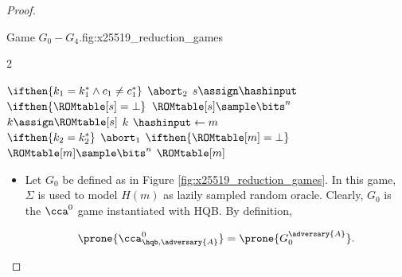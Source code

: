 \begin{proof}
\begin{gamefigure}{Game $G_0 - G_4$.}{fig:x25519_reduction_games}
\begin{games}{2}
\begin{gameenv}{\oracledec}
                            \State $\ifthen{k_1 = k^*_1 \wedge c_1 \neq c^*_1}$
                                \State \quad $\abort_2$
                                \EndBox
                                \State $s \assign \hashinput$
                                \State $\ifthen{\ROMtable[s] = \bot}$
                                    \State \quad $\ROMtable[s] \sample \bits^{n}$
                                    \State $k \assign \ROMtable[s]$
                                    \State \Return $k$
                                    \Statex
                                    \State \underline{}
                                    \State $\hashinput \gets m$
                                    \BeginBox[draw=\gtwo]
                                    \\
                                    $\ifthen{k_2 = k^*_2}$
                                        \State \qquad $\abort_1$
                                        \EndBox
                                        \State $\ifthen{\ROMtable[m] = \bot}$
                                            \State \quad $\ROMtable[m] \sample \bits^{n}$
                                            \State \Return $\ROMtable[m]$
                                        \end{gameenv}
                                    \end{games}
                                    \begin{gameenv}{}

                                    \end{gameenv}
                                \end{gamefigure}

                                \begin{itemize}
                                \item[\textbf{Game 0}]
                                    Let $G_0$ be defined as in Figure \ref{fig:x25519_reduction_games}.
                                    In this game, $\Sigma$ is used to model $H(m)$ as lazily sampled random oracle.
                                    Clearly, $G_0$ is the $\cca^0$ game instantiated with HQB.
                                    By definition,

                                    \[ \prone{\cca^0_{\hqb,\adversary{A}}} = \prone{G^{\adversary{A}}_0}. \]
                                \end{itemize}


\end{proof}
